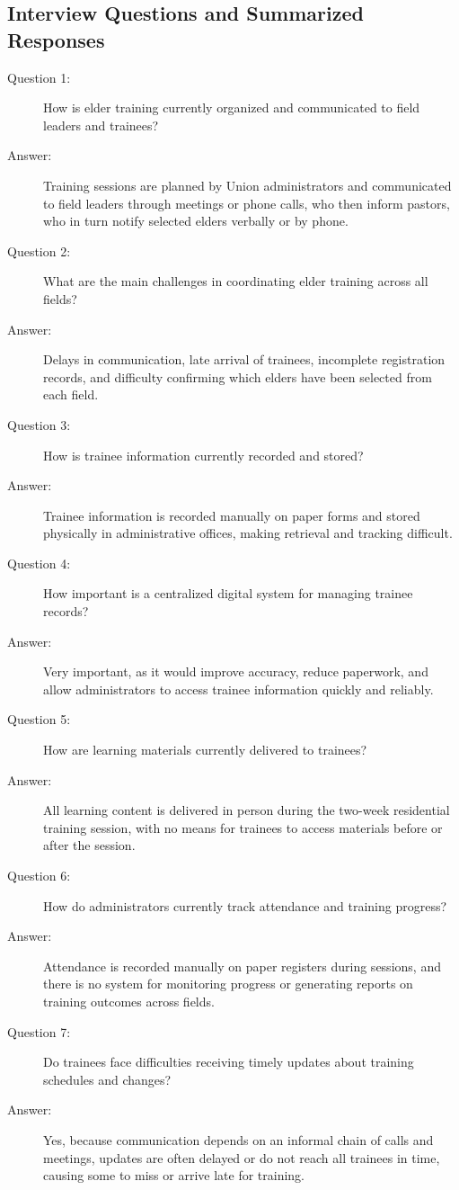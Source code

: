 \documentclass[12pt]{report}
\begin{document}
\subsection*{Interview Questions and Summarized Responses}
\begin{description}
    \item[Question 1:] How is elder training currently organized and communicated to field leaders and trainees?
    \item[Answer:] Training sessions are planned by Union administrators and communicated to field leaders through meetings or phone calls, who then inform pastors, who in turn notify selected elders verbally or by phone.
    \item[Question 2:] What are the main challenges in coordinating elder training across all fields?
    \item[Answer:] Delays in communication, late arrival of trainees, incomplete registration records, and difficulty confirming which elders have been selected from each field.
    \item[Question 3:] How is trainee information currently recorded and stored?
    \item[Answer:] Trainee information is recorded manually on paper forms and stored physically in administrative offices, making retrieval and tracking difficult.
    \item[Question 4:] How important is a centralized digital system for managing trainee records?
    \item[Answer:] Very important, as it would improve accuracy, reduce paperwork, and allow administrators to access trainee information quickly and reliably.
    \item[Question 5:] How are learning materials currently delivered to trainees?
    \item[Answer:] All learning content is delivered in person during the two-week residential training session, with no means for trainees to access materials before or after the session.
    \item[Question 6:] How do administrators currently track attendance and training progress?
    \item[Answer:] Attendance is recorded manually on paper registers during sessions, and there is no system for monitoring progress or generating reports on training outcomes across fields.
    \item[Question 7:] Do trainees face difficulties receiving timely updates about training schedules and changes?
    \item[Answer:] Yes, because communication depends on an informal chain of calls and meetings, updates are often delayed or do not reach all trainees in time, causing some to miss or arrive late for training.

\end{description}
\end{document}
